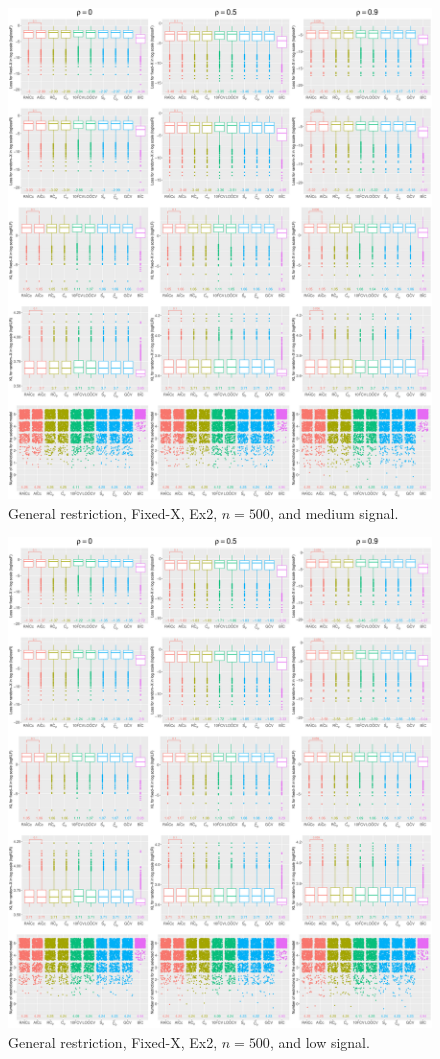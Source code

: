 \begin{figure}[!ht]
\centering
\includegraphics[width=\textwidth]{figures/supplement/fixedx/general_restriction/Ex2_n500_msnr.eps}
\caption{General restriction, Fixed-X, Ex2, $n=500$, and medium signal.}
\end{figure}
\clearpage
\begin{figure}[!ht]
\centering
\includegraphics[width=\textwidth]{figures/supplement/fixedx/general_restriction/Ex2_n500_lsnr.eps}
\caption{General restriction, Fixed-X, Ex2, $n=500$, and low signal.}
\end{figure}
